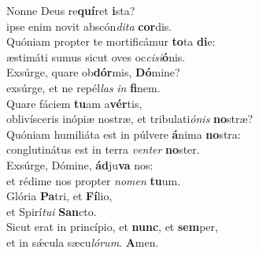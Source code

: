 \evenverse Nonne Deus re\textbf{quí}ret \textbf{i}sta?~\*\\
\evenverse ipse enim novit abscón\textit{di}\textit{ta} \textbf{cor}dis.\\
\oddverse Quóniam propter te mortificámur \textbf{to}ta \textbf{di}e:~\*\\
\oddverse æstimáti sumus sicut oves oc\textit{ci}\textit{si}\textbf{ó}nis.\\
\evenverse Exsúrge, quare ob\textbf{dór}mis, \textbf{Dó}mine?~\*\\
\evenverse exsúrge, et ne repél\textit{las} \textit{in} \textbf{fi}nem.\\
\oddverse Quare fáciem \textbf{tu}am a\textbf{vér}tis,~\*\\
\oddverse oblivísceris inópiæ nostræ, et tribulati\textit{ó}\textit{nis} \textbf{no}stræ?\\
\evenverse Quóniam humiliáta est in púlvere \textbf{á}nima \textbf{no}stra:~\*\\
\evenverse conglutinátus est in terra \textit{ven}\textit{ter} \textbf{no}ster.\\
\oddverse Exsúrge, Dómine, \textbf{ád}ju\textbf{va} nos:~\*\\
\oddverse et rédime nos propter \textit{no}\textit{men} \textbf{tu}um.\\
\evenverse Glória \textbf{Pa}tri, et \textbf{Fí}lio,~\*\\
\evenverse et Spirí\textit{tu}\textit{i} \textbf{San}cto.\\
\oddverse Sicut erat in princípio, et \textbf{nunc}, et \textbf{sem}per,~\*\\
\oddverse et in sǽcula sæcu\textit{ló}\textit{rum}. \textbf{A}men.\\
